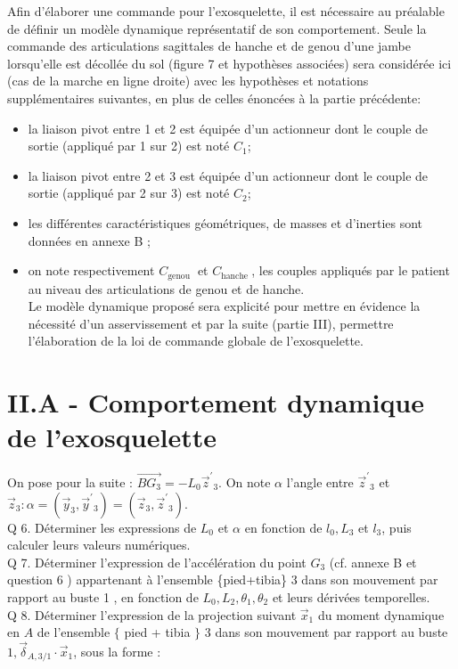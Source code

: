 \documentclass[10pt]{article}
\begin{document}
Afin d'élaborer une commande pour l'exosquelette, il est nécessaire au préalable de définir un modèle dynamique représentatif de son comportement. Seule la commande des articulations sagittales de hanche et de genou d'une jambe lorsqu'elle est décollée du sol (figure 7 et hypothèses associées) sera considérée ici (cas de la marche en ligne droite) avec les hypothèses et notations supplémentaires suivantes, en plus de celles énoncées à la partie précédente:

\begin{itemize}
  \item la liaison pivot entre 1 et 2 est équipée d'un actionneur dont le couple de sortie (appliqué par 1 sur 2) est noté $C_{1}$;
  \item la liaison pivot entre 2 et 3 est équipée d'un actionneur dont le couple de sortie (appliqué par 2 sur 3) est noté $C_{2}$;
  \item les différentes caractéristiques géométriques, de masses et d'inerties sont données en annexe B ;
  \item on note respectivement $C_{\text {genou }}$ et $C_{\text {hanche }}$, les couples appliqués par le patient au niveau des articulations de genou et de hanche.\\
Le modèle dynamique proposé sera explicité pour mettre en évidence la nécessité d'un asservissement et par la suite (partie III), permettre l'élaboration de la loi de commande globale de l'exosquelette.
\end{itemize}

\section*{II.A - Comportement dynamique de l'exosquelette}
On pose pour la suite : $\overrightarrow{B G_{3}}=-L_{0} \vec{z}^{\prime}{ }_{3}$. On note $\alpha$ l'angle entre $\vec{z}^{\prime}{ }_{3}$ et $\vec{z}_{3}: \alpha=\left(\vec{y}_{3}, \vec{y}^{\prime}{ }_{3}\right)=\left(\vec{z}_{3}, \vec{z}^{\prime}{ }_{3}\right)$.\\
Q 6. Déterminer les expressions de $L_{0}$ et $\alpha$ en fonction de $l_{0}, L_{3}$ et $l_{3}$, puis calculer leurs valeurs numériques.\\
Q 7. Déterminer l'expression de l'accélération du point $G_{3}$ (cf. annexe B et question 6 ) appartenant à l'ensemble \{pied+tibia\} 3 dans son mouvement par rapport au buste 1 , en fonction de $L_{0}, L_{2}, \theta_{1}, \theta_{2}$ et leurs dérivées temporelles.\\
Q 8. Déterminer l'expression de la projection suivant $\vec{x}_{1}$ du moment dynamique en $A$ de l'ensemble $\{$ pied + tibia $\}$ 3 dans son mouvement par rapport au buste $1, \vec{\delta}_{A, 3 / 1} \cdot \vec{x}_{1}$, sous la forme :
\end{document}
